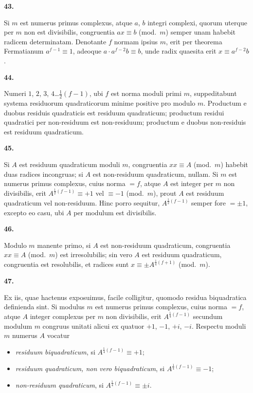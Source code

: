 \documentclass[12pt,a4paper]{article}
\newcommand{\art}[1]{\begin{center}\textbf{#1.}\end{center}}
\begin{document}
\art{43}

Si $m$ est numerus primus complexus, atque $a$, $b$ integri complexi, quorum uterque per $m$ non est divisibilis, congruentia $ax\equiv b$ (mod.~$m$) semper unam habebit radicem determinatam. Denotante $f$ normam ipsius $m$, erit per theorema Fermatianum $a^{f-1}\equiv 1$, adeoque $a\cdot a^{f-2}b\equiv b$, unde radix quaesita erit $x\equiv a^{f-2}b$.

\art{44}

Numeri $1$, $2$, $3$, $4$\ldots$\frac{1}{2}(f-1)$, ubi $f$ est norma moduli primi $m$, suppeditabunt systema residuorum quadraticorum minime positive pro modulo $m$. Productum e duobus residuis quadraticis est residuum quadraticum; productum residui quadratici per non-residuum est non-residuum; productum e duobus non-residuis est residuum quadraticum.

\art{45}

Si $A$ est residuum quadraticum moduli $m$, congruentia $xx\equiv A$ (mod.~$m$) habebit duas radices incongruas; si $A$ est non-residuum quadraticum, nullam. Si $m$ est numerus primus complexus, cuius norma $=f$, atque $A$ est integer per $m$ non divisibilis, erit $A^{\frac{1}{2}(f-1)}\equiv +1$ vel $\equiv -1$ (mod.~$m$), prout $A$ est residuum quadraticum vel non-residuum. Hinc porro sequitur, $A^{\frac{1}{2}(f-1)}$ semper fore $=\pm 1$, excepto eo casu, ubi $A$ per modulum est divisibilis.

\art{46}

Modulo $m$ manente primo, si $A$ est non-residuum quadraticum, congruentia $xx\equiv A$ (mod.~$m$) est irresolubilis; sin vero $A$ est residuum quadraticum, congruentia est resolubilis, et radices sunt $x\equiv \pm A^{\frac{1}{4}(f+1)}$ (mod.~$m$).

\art{47}

Ex iis, quae hactenus exposuimus, facile colligitur, quomodo residua biquadratica definienda sint. Si modulus $m$ est numerus primus complexus, cuius norma $=f$, atque $A$ integer complexus per $m$ non divisibilis, erit $A^{\frac{1}{4}(f-1)}$ secundum modulum $m$ congruus unitati alicui ex quatuor $+1$, $-1$, $+i$, $-i$. Respectu moduli $m$ numerus $A$ vocatur
\begin{itemize}
\item \textit{residuum biquadraticum}, si $A^{\frac{1}{4}(f-1)}\equiv +1$;
\item \textit{residuum quadraticum, non vero biquadraticum}, si $A^{\frac{1}{4}(f-1)}\equiv -1$;
\item \textit{non-residuum quadraticum}, si $A^{\frac{1}{4}(f-1)}\equiv \pm i$.
\end{itemize}
\end{document}
